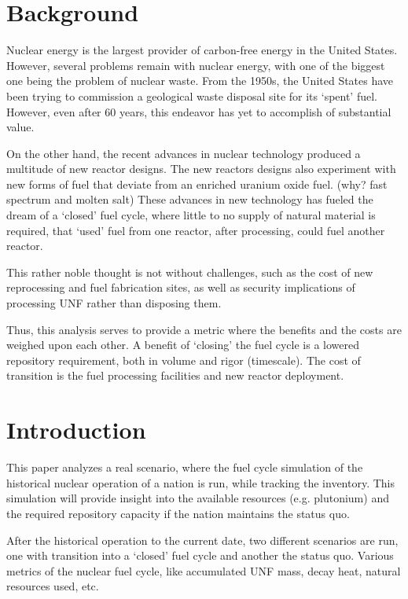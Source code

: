 \documentclass{article}
\begin{document}
\section{Background}
Nuclear energy is the largest provider of carbon-free energy
in the United States. However, several problems remain with nuclear
energy, with one of the biggest one being the problem of nuclear waste.
From the 1950s, the United States have been trying to commission a 
geological waste disposal site for its `spent' fuel. However, even
after 60 years, this endeavor has yet to accomplish of substantial value.

On the other hand, the recent advances in nuclear technology produced
a multitude of new reactor designs. The new reactors designs also 
experiment with new forms of fuel that deviate from an enriched uranium
oxide fuel. (why? fast spectrum and molten salt) These advances in new
technology has fueled the dream of a `closed' fuel cycle, where little to no
supply of natural material is required, that `used' fuel from one reactor,
after processing, could fuel another reactor.

This rather noble thought is not without challenges, such as the 
cost of new reprocessing and fuel fabrication sites, as well as
security implications of processing \gls{UNF} rather than disposing them.

Thus, this analysis serves to provide a metric where the benefits and
the costs are weighed upon each other. A benefit of `closing' the fuel cycle
is a lowered repository requirement, both in volume and rigor (timescale).
The cost of transition is the fuel processing facilities and new reactor
deployment.



\section{Introduction}
This paper analyzes a real scenario, where the fuel cycle
simulation of the historical nuclear operation of a nation is run,
while tracking the inventory. This simulation will provide insight into
the available resources (e.g. plutonium) and the required repository
capacity if the nation maintains the status quo.

After the historical operation to the current date, two different 
scenarios are run, one with transition into a `closed' fuel cycle
and another the status quo. Various metrics of the nuclear fuel cycle,
like accumulated \gls{UNF} mass, decay heat, natural resources used, etc.
\end{document}
